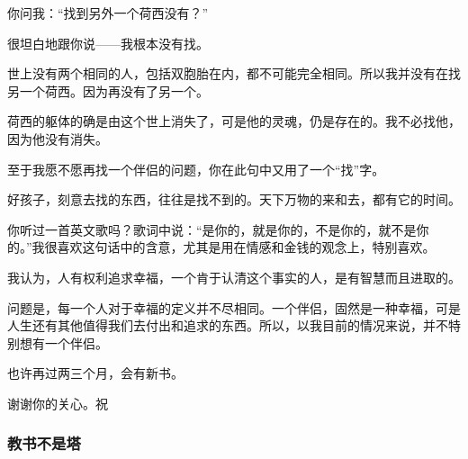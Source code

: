 \par {}
\par 你问我：“找到另外一个荷西没有？”
\par 很坦白地跟你说——我根本没有找。
\par 世上没有两个相同的人，包括双胞胎在内，都不可能完全相同。所以我并没有在找另一个荷西。因为再没有了另一个。
\par 荷西的躯体的确是由这个世上消失了，可是他的灵魂，仍是存在的。我不必找他，因为他没有消失。
\par 至于我愿不愿再找一个伴侣的问题，你在此句中又用了一个“找”字。
\par 好孩子，刻意去找的东西，往往是找不到的。天下万物的来和去，都有它的时间。
\par 你听过一首英文歌吗？歌词中说：“是你的，就是你的，不是你的，就不是你的。”我很喜欢这句话中的含意，尤其是用在情感和金钱的观念上，特别喜欢。
\par 我认为，人有权利追求幸福，一个肯于认清这个事实的人，是有智慧而且进取的。
\par 问题是，每一个人对于幸福的定义并不尽相同。一个伴侣，固然是一种幸福，可是人生还有其他值得我们去付出和追求的东西。所以，以我目前的情况来说，并不特别想有一个伴侣。
\par 也许再过两三个月，会有新书。
\par 谢谢你的关心。祝
\par {}
\par {}


\subsubsection{教书不是塔}


